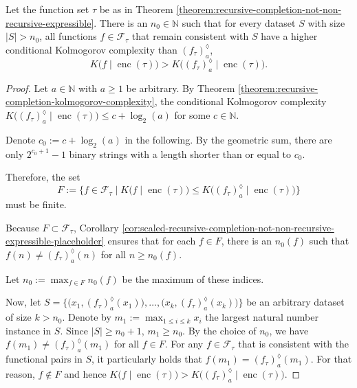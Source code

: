 \begin{theorem}
	\label{theorem:surpass-kolmogorov-complexity-threshold}
	
	Let the function set $\tau$ be as in Theorem \ref{theorem:recursive-completion-not-non-recursive-expressible}.
	There is an $n_0\in\mathbb{N}$ such that for every dataset $S$ with size $|S|> n_0$, all functions $f\in \mathcal{F}_{\tau}$ that remain consistent with $S$ have a higher conditional Kolmogorov complexity than $\left(f_{\tau}\right)_a^{\lozenge}$,
	\begin{equation}
		K\bigl(f\mid \operatorname{enc}(\tau)\bigr) > K\bigl(\left(f_{\tau}\right)_a^{\lozenge} \mid \operatorname{enc}(\tau)\bigr).
	\end{equation}
\end{theorem}
\begin{proof}
	Let $a\in\mathbb{N}$ with $a\geq 1$ be arbitrary.
	By Theorem \ref{theorem:recursive-completion-kolmogorov-complexity}, the conditional Kolmogorov complexity $K\bigl(\left(f_{\tau}\right)_a^{\lozenge} \mid \operatorname{enc}(\tau)\bigr)\leq c+\log_2(a)$ for some $c\in\mathbb{N}$.
	
	Denote $c_0:=c+\log_2(a)$ in the following.
	By the geometric sum, there are only $2^{c_0+1}-1$ binary strings with a length shorter than or equal to $c_0$.
	
	Therefore, the set 
	\begin{equation}
		F:=\bigl\{f\in \mathcal{F}_{\tau} \mid K\bigl(f\mid \operatorname{enc}(\tau)\bigr)\leq K\bigl(\left(f_{\tau}\right)_a^{\lozenge} \mid \operatorname{enc}(\tau)\bigr)\bigr\}	
	\end{equation}
	must be finite.
	
	Because $F\subset \mathcal{F}_{\tau}$, Corollary \ref{cor:scaled-recursive-completion-not-non-recursive-expressible-placeholder} ensures that for each $f\in F$, there is an $n_0(f)$ such that $f(n)\neq \left(f_{\tau}\right)_a^{\lozenge}(n)$ for all $n\geq n_0(f)$.
	
	Let $n_0:=\max_{f\in F}n_0(f)$ be the maximum of these indices.
	
	Now, let $S=\bigl\{\bigl(x_1,\left(f_{\tau}\right)_a^{\lozenge}(x_1)\bigr),\dots,\bigl(x_k,\left(f_{\tau}\right)_a^{\lozenge}(x_k)\bigr)\bigr\}$ be an arbitrary dataset of size $k > n_0$.
	Denote by $m_1:=\max_{1\leq i\leq k}x_i$ the largest natural number instance in $S$.
	Since $|S|\geq n_0+1$, $m_1\geq n_0$.
	By the choice of $n_0$, we have $f(m_1)\neq \left(f_{\tau}\right)_a^{\lozenge}(m_1)$ for all $f\in F$.
	For any $f\in\mathcal{F}_{\tau}$ that is consistent with the functional pairs in $S$, it particularly holds that $f(m_1)=\left(f_{\tau}\right)_a^{\lozenge}(m_1)$.
	For that reason, $f\notin F$ and hence $K\bigl(f\mid \operatorname{enc}(\tau)\bigr) > K\bigl(\left(f_{\tau}\right)_a^{\lozenge} \mid \operatorname{enc}(\tau)\bigr)$.
\end{proof}

